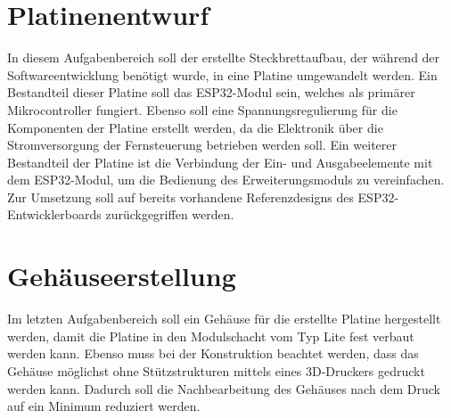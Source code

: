 \section{Platinenentwurf}
\label{section:pcbRequirement}
In diesem Aufgabenbereich soll der erstellte Steckbrettaufbau, der während der Softwareentwicklung benötigt wurde, in eine Platine umgewandelt werden. Ein Bestandteil dieser Platine soll das ESP32-Modul sein, welches als primärer Mikrocontroller fungiert. Ebenso soll eine Spannungsregulierung für die Komponenten der Platine erstellt werden, da die Elektronik über die Stromversorgung der Fernsteuerung betrieben werden soll. Ein weiterer Bestandteil der Platine ist die Verbindung der Ein- und Ausgabeelemente mit dem ESP32-Modul, um die Bedienung des Erweiterungsmoduls zu vereinfachen. Zur Umsetzung soll auf bereits vorhandene Referenzdesigns des ESP32-Entwicklerboards zurückgegriffen werden.

\section{Gehäuseerstellung}

Im letzten Aufgabenbereich soll ein Gehäuse für die erstellte Platine hergestellt werden, damit die Platine in den Modulschacht vom Typ Lite fest verbaut werden kann. Ebenso muss bei der Konstruktion beachtet werden, dass das Gehäuse möglichst ohne Stützstrukturen mittels eines 3D-Druckers gedruckt werden kann. Dadurch soll die Nachbearbeitung des Gehäuses nach dem Druck auf ein Minimum reduziert werden.